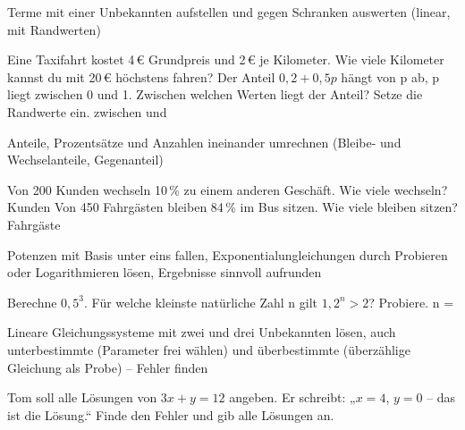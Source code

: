 \begin{aufgabe}{Terme mit einer Unbekannten aufstellen und gegen Schranken auswerten (linear, mit Randwerten)}
\begin{teile}
\teil Eine Taxifahrt kostet 4\,€ Grundpreis und 2\,€ je Kilometer. Wie viele Kilometer kannst du mit 20\,€ höchstens fahren? \leerfeld[km]
\teil Der Anteil $0{,}2 + 0{,}5p$ hängt von p ab, p liegt zwischen 0 und 1. Zwischen welchen Werten liegt der Anteil? Setze die Randwerte ein. zwischen \leerfeld und \leerfeld
\end{teile}
\end{aufgabe}

\begin{aufgabe}{Anteile, Prozentsätze und Anzahlen ineinander umrechnen (Bleibe- und Wechselanteile, Gegenanteil)}
\begin{teile}
\teil Von 200 Kunden wechseln 10\,\% zu einem anderen Geschäft. Wie viele wechseln? \leerfeld Kunden
\teil Von 450 Fahrgästen bleiben 84\,\% im Bus sitzen. Wie viele bleiben sitzen? \leerfeld Fahrgäste
\end{teile}
\end{aufgabe}

\begin{aufgabe}{Potenzen mit Basis unter eins fallen, Exponentialungleichungen durch Probieren oder Logarithmieren lösen, Ergebnisse sinnvoll aufrunden}
\begin{teile}
\teil Berechne $0{,}5^3$. \leerfeld
\teil Für welche kleinste natürliche Zahl n gilt $1{,}2^n > 2$? Probiere. n = \leerfeld
\end{teile}
\end{aufgabe}

\begin{aufgabe}{Lineare Gleichungssysteme mit zwei und drei Unbekannten lösen, auch unterbestimmte (Parameter frei wählen) und überbestimmte (überzählige Gleichung als Probe) – Fehler finden}
\begin{teile}
\teil Tom soll alle Lösungen von $3x + y = 12$ angeben. Er schreibt: „$x = 4$, $y = 0$ – das ist die Lösung.“ Finde den Fehler und gib alle Lösungen an.
\end{teile}
\end{aufgabe}

